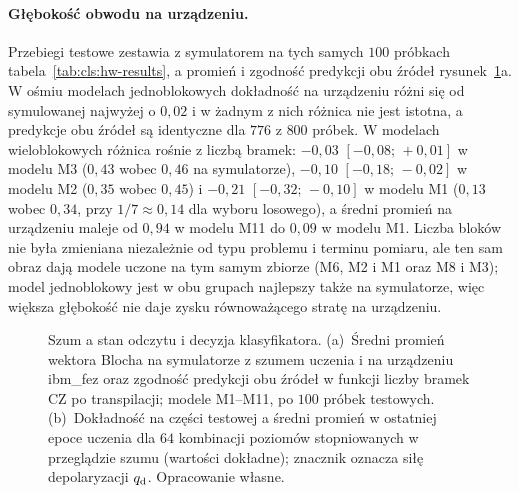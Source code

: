 \paragraph{Głębokość obwodu na urządzeniu.}
Przebiegi testowe zestawia z symulatorem na tych samych $100$ próbkach tabela~\ref{tab:cls:hw-results}, a promień i zgodność predykcji obu źródeł rysunek~\ref{fig:cls:noise-results}a.
W ośmiu modelach jednoblokowych dokładność na urządzeniu różni się od symulowanej najwyżej o $0{,}02$ i w żadnym z nich różnica nie jest istotna, a predykcje obu źródeł są identyczne dla $776$ z $800$ próbek.
W modelach wieloblokowych różnica rośnie z liczbą bramek: $-0{,}03$ $[-0{,}08;\,+0{,}01]$ w modelu M3 ($0{,}43$ wobec $0{,}46$ na symulatorze), $-0{,}10$ $[-0{,}18;\,-0{,}02]$ w modelu M2 ($0{,}35$ wobec $0{,}45$) i $-0{,}21$ $[-0{,}32;\,-0{,}10]$ w modelu M1 ($0{,}13$ wobec $0{,}34$, przy $1/7\approx0{,}14$ dla wyboru losowego), a średni promień na urządzeniu maleje od $0{,}94$ w modelu M11 do $0{,}09$ w modelu M1.
Liczba bloków nie była zmieniana niezależnie od typu problemu i terminu pomiaru, ale ten sam obraz dają modele uczone na tym samym zbiorze (M6, M2 i M1 oraz M8 i M3); model jednoblokowy jest w obu grupach najlepszy także na symulatorze, więc większa głębokość nie daje zysku równoważącego stratę na urządzeniu.

\begin{figure}[tb]
\centering

\caption[Promień wektora Blocha i zgodność predykcji a liczba bramek oraz dokładność a promień w przeglądzie szumu]{Szum a stan odczytu i decyzja klasyfikatora. (a)~Średni promień wektora Blocha na symulatorze z szumem uczenia i na urządzeniu ibm\_fez oraz zgodność predykcji obu źródeł w funkcji liczby bramek CZ po transpilacji; modele M1--M11, po $100$ próbek testowych. (b)~Dokładność na części testowej a średni promień w ostatniej epoce uczenia dla $64$ kombinacji poziomów stopniowanych w przeglądzie szumu (wartości dokładne); znacznik oznacza siłę depolaryzacji $q_{\mathrm{d}}$. Opracowanie własne.}
\label{fig:cls:noise-results}
\end{figure}

